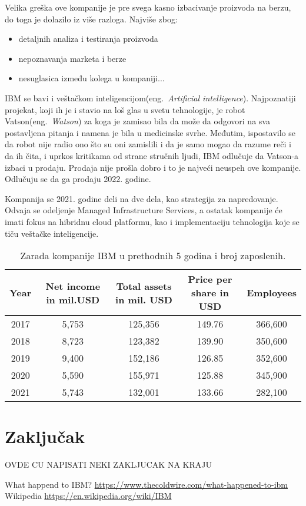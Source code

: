 \documentclass[a4paper]{article}
\begin{document}
Velika greška ove kompanije je pre svega kasno izbacivanje proizvoda na berzu, do toga je dolazilo iz više razloga. Najviše zbog:

\begin{itemize}
\item detaljnih analiza i testiranja proizvoda
\item nepoznavanja marketa i berze
\item nesuglasica između kolega u kompaniji...
\end{itemize}

IBM se bavi i veštačkom inteligencijom(eng.~{\em Artificial intelligence}). Najpoznatiji projekat, koji ih je i stavio na loš glas u svetu tehnologije, je robot Vatson(eng.~{\em Watson}) za koga je zamisao bila da može da odgovori na sva postavljena pitanja i namena je bila u medicinske svrhe. Međutim, ispostavilo se da robot nije radio ono što su oni zamislili i da je samo mogao da razume reči i da ih čita, i uprkos kritikama od strane stručnih ljudi, IBM odlučuje da Vatson-a izbaci u prodaju. Prodaja nije prošla dobro i to je najveći neuspeh ove kompanije. Odlučuju se da ga prodaju 2022. godine.

Kompanija se 2021. godine deli na dve dela, kao strategija za napredovanje. Odvaja se odeljenje Managed Infrastructure Services, a ostatak kompanije će imati fokus na hibridnu cloud platformu, kao i implementaciju tehnologija koje se tiču veštačke inteligencije.


\begin{table}[h!]
\begin{center}
\caption{Zarada kompanije IBM u prethodnih 5 godina i broj zaposlenih. \cite{tabela}}
\begin{tabular}{|c|c|c|c|c|} \hline
Year& Net income in mil.USD& Total assets in mil. USD& Price per share in USD& Employees \\ \hline
2017	&5,753	&125,356	&149.76	&366,600\\ \hline
2018	&8,723	&123,382	&139.90	&350,600\\ \hline
2019	&9,400	&152,186	&126.85	&352,600\\ \hline
2020	&5,590	&155,971	&125.88	&345,900\\ \hline
2021	&5,743	&132,001	&133.66	&282,100\\ \hline
\end{tabular}
\label{tab:tabela1}
\end{center}
\end{table}

\section{Zaključak}
OVDE CU NAPISATI NEKI ZAKLJUCAK NA KRAJU %

\renewcommand{\refname}{Literatura}
\begin{thebibliography}{9}

 What happend to IBM? 
\url{https://www.thecoldwire.com/what-happened-to-ibm}
 Wikipedia %
\url{https://en.wikipedia.org/wiki/IBM}
\end{thebibliography}
\end{document}
